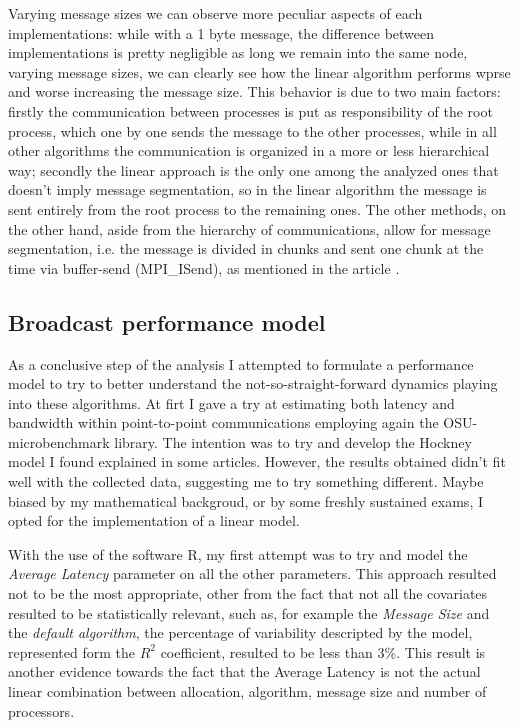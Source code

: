 \documentclass{article}
\begin{document}
	Varying message sizes we can observe more peculiar aspects of each implementations: while with a 1 byte message, the difference between implementations is pretty negligible as long we remain into the same node, varying message sizes, we can clearly see how the linear algorithm performs wprse and worse increasing the message size.
	This behavior is due to two main factors: firstly the communication between processes is put as responsibility of the root process, which one by one sends the message to the other processes, while in all other algorithms the communication is organized in a more or less hierarchical way; secondly the linear approach is the only one among the analyzed ones that doesn't imply message segmentation, so in the linear algorithm the message is sent entirely from the root process to the remaining ones. The other methods, on the other hand, aside from the hierarchy of communications, allow for message segmentation, i.e. the message is divided in chunks and sent one chunk at the time via buffer-send (MPI\_ISend), as mentioned in the article \cite{bcast_article}.
	
	\subsection{Broadcast performance model}
	As a conclusive step of the analysis I attempted to formulate a performance model to try to better understand the not-so-straight-forward dynamics playing into these algorithms. 
	At firt I gave a try at estimating both latency and bandwidth within point-to-point communications employing again the OSU-microbenchmark library. The intention was to try and develop the Hockney model I found explained in some articles. However, the results obtained didn't fit well with the collected data, suggesting me to try something different. Maybe biased by my mathematical backgroud, or by some freshly sustained exams, I opted for the implementation of a linear model.
	
	With the use of the software R, my first attempt was to try and model the \textit{Average Latency} parameter on all the other parameters. This approach resulted not to be the most appropriate, other from the fact that not all the covariates resulted to be statistically relevant, such as, for example the \textit{Message Size} and the \textit{default algorithm}, the percentage of variability descripted by the model, represented form the $R^2$ coefficient, resulted to be less than $3\%$.
	This result is another evidence towards the fact that the Average Latency is not the actual linear combination between allocation, algorithm, message size and number of processors.
	
\end{document}
